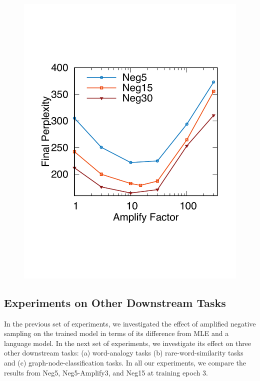 \begin{figure}[ht]
\begin{minipage}{.31\textwidth}
		\label{fig:neg15}
	\end{minipage}%
	\begin{minipage}{.38\textwidth}
		\captionsetup{justification=centering,margin=0.1cm}
		\centering
		\includegraphics[width=.8\linewidth]{Graph/negSamp/L2NegAllAmplify.pdf}

		\label{fig:factor}
	\end{minipage}%

\end{figure}

\subsection{Experiments on Other Downstream Tasks}\label{sec:realworld}
In the previous set of experiments, we investigated the effect of amplified negative sampling on the trained model in terms of its difference from MLE and a language model. In the next set of experiments, we investigate its effect on three other downstream tasks: (a) word-analogy tasks (b) rare-word-similarity tasks and (c) graph-node-classification tasks. In all our experiments, we compare the results from Neg5, Neg5-Amplify3, and Neg15 at training epoch 3. 

